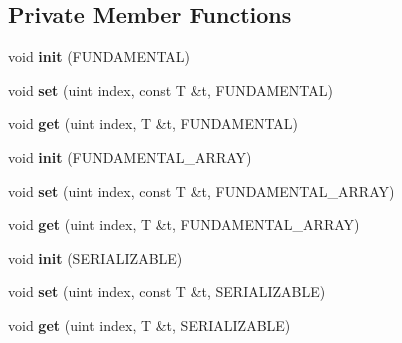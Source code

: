 \subsection*{Private Member Functions}
\begin{DoxyCompactItemize}
\item 
\mbox{\label{classshared__memory_1_1array_a41258d788855ccc8435efb2017bdd068}} 
void {\bfseries init} (F\+U\+N\+D\+A\+M\+E\+N\+T\+AL)
\item 
\mbox{\label{classshared__memory_1_1array_ad7fa6301507f10efe97ce3ad40187d9f}} 
void {\bfseries set} (uint index, const T \&t, F\+U\+N\+D\+A\+M\+E\+N\+T\+AL)
\item 
\mbox{\label{classshared__memory_1_1array_a0a54a689331205da7338f7c5891a6ee5}} 
void {\bfseries get} (uint index, T \&t, F\+U\+N\+D\+A\+M\+E\+N\+T\+AL)
\item 
\mbox{\label{classshared__memory_1_1array_ac0e57adf8e47afae3f8053c20c3e15f2}} 
void {\bfseries init} (F\+U\+N\+D\+A\+M\+E\+N\+T\+A\+L\+\_\+\+A\+R\+R\+AY)
\item 
\mbox{\label{classshared__memory_1_1array_a71bbc60da4a88fd51b3124cdb6cd1ae3}} 
void {\bfseries set} (uint index, const T \&t, F\+U\+N\+D\+A\+M\+E\+N\+T\+A\+L\+\_\+\+A\+R\+R\+AY)
\item 
\mbox{\label{classshared__memory_1_1array_af12c8f76fc48b3ec1ff2c2c82d104837}} 
void {\bfseries get} (uint index, T \&t, F\+U\+N\+D\+A\+M\+E\+N\+T\+A\+L\+\_\+\+A\+R\+R\+AY)
\item 
\mbox{\label{classshared__memory_1_1array_a487be484bf27d17f8c7547a57ff995f9}} 
void {\bfseries init} (S\+E\+R\+I\+A\+L\+I\+Z\+A\+B\+LE)
\item 
\mbox{\label{classshared__memory_1_1array_a951c9ca373e942f094910bea57953eb0}} 
void {\bfseries set} (uint index, const T \&t, S\+E\+R\+I\+A\+L\+I\+Z\+A\+B\+LE)
\item 
\mbox{\label{classshared__memory_1_1array_afb0025021b69b790c152c27ef441cd66}} 
void {\bfseries get} (uint index, T \&t, S\+E\+R\+I\+A\+L\+I\+Z\+A\+B\+LE)
\end{DoxyCompactItemize}
